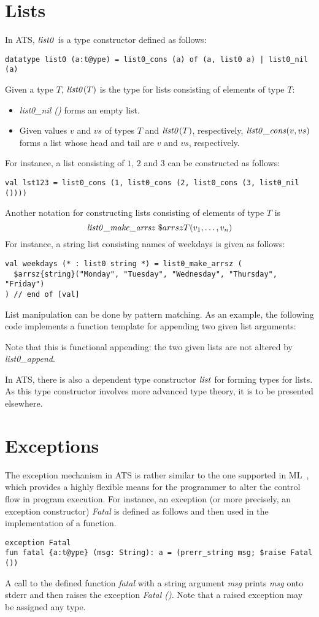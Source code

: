\section{Lists}
In ATS, ${\it list0}$ is a type constructor defined as follows:
\begin{verbatim}
datatype list0 (a:t@ype) = list0_cons (a) of (a, list0 a) | list0_nil (a) 
\end{verbatim}
Given a type $T$, ${\it list0}(T)$ is the type for lists consisting of
elements of type $T$:
\begin{itemize}
\item {\it list0\_nil ()} forms an empty list.
\item Given values $v$ and $vs$ of types $T$ and ${\it list0}(T)$,
respectively, ${\it list0\_cons}(v, vs)$ forms a list whose head and tail
are $v$ and $vs$, respectively.
\end{itemize}
For instance, a list consisting of $1$, $2$ and $3$ can be constructed as
follows:
\begin{verbatim}
val lst123 = list0_cons (1, list0_cons (2, list0_cons (3, list0_nil ())))
\end{verbatim}
Another notation for constructing lists consisting of elements of type $T$
is $${\it list0\_make\_arrsz}~\$arrsz{T}(v_1,\ldots,v_n)$$
For instance, a string list consisting names of weekdays is given as follows:
\begin{verbatim}
val weekdays (* : list0 string *) = list0_make_arrsz (
  $arrsz{string}("Monday", "Tuesday", "Wednesday", "Thursday", "Friday")
) // end of [val]
\end{verbatim}
List manipulation can be done by pattern matching. As an example, the
following code implements a function template for appending two given list
arguments:

Note that this is functional appending: the two given lists are not altered
by {\it list0\_append}.

In ATS, there is also a dependent type constructor ${\it list}$ for forming
types for lists. As this type constructor involves more advanced type
theory, it is to be presented elsewhere.

\section{Exceptions}
The exception mechanism in ATS is rather similar to the one supported in
ML~\cite{SML97}, which provides a highly flexible means for the programmer
to alter the control flow in program execution. For instance,
an exception (or more precisely, an exception constructor) {\em
Fatal} is defined as follows and then used in the implementation of a
function.
\begin{verbatim}
exception Fatal
fun fatal {a:t@ype} (msg: String): a = (prerr_string msg; $raise Fatal ())
\end{verbatim}
A call to the defined function {\it fatal} with a string argument {\it msg}
prints {\it msg} onto stderr and then raises the exception {\it Fatal ()}.
Note that a raised exception may be assigned any type.

